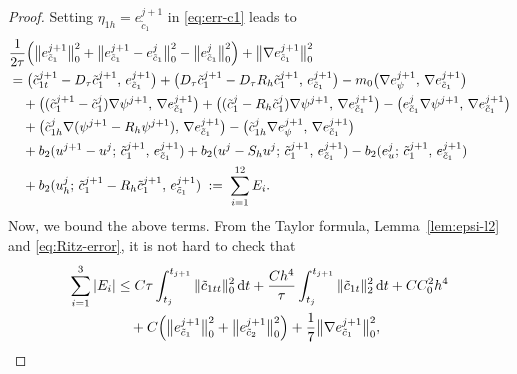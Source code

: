 \begin{proof}
Setting $\eta_{1h} = e_{\tilde{c}_{1}}^{j+1}$ in \eqref{eq:err-c1} leads to
\begin{align}
  &\frac{1}{2\tau}\Bigl(\bigl\|e_{\tilde{c}_{1}}^{j+1}\bigr\|_{0}^{2}
                       + \bigl\|e_{\tilde{c}_{1}}^{j+1} - e_{\tilde{c}_{1}}^{j}\bigr\|_{0}^{2}
                       - \bigl\|e_{\tilde{c}_{1}}^{j}\bigr\|_{0}^{2}\Bigr)
   + \bigl\|\nabla e_{\tilde{c}_{1}}^{j+1}\bigr\|_{0}^{2}
  \nonumber\\
  &= \bigl(\tilde{c}_{1t}^{j+1} - D_{\tau}\tilde{c}_{1}^{j+1},\, e_{\tilde{c}_{1}}^{j+1}\bigr)
   + \bigl(D_{\tau}\tilde{c}_{1}^{j+1} - D_{\tau}R_{h}\tilde{c}_{1}^{j+1},\, e_{\tilde{c}_{1}}^{j+1}\bigr)
   - m_{0}\bigl(\nabla e_{\psi}^{j+1},\, \nabla e_{\tilde{c}_{1}}^{j+1}\bigr)
  \nonumber\\
  &\quad + \bigl((\tilde{c}_{1}^{j+1}-\tilde{c}_{1}^{j})\nabla\psi^{j+1},\, \nabla e_{\tilde{c}_{1}}^{j+1}\bigr)
   + \bigl((\tilde{c}_{1}^{j} - R_{h}\tilde{c}_{1}^{j})\nabla\psi^{j+1},\, \nabla e_{\tilde{c}_{1}}^{j+1}\bigr)
   - \bigl(e_{\tilde{c}_{1}}^{j}\nabla\psi^{j+1},\, \nabla e_{\tilde{c}_{1}}^{j+1}\bigr)
  \nonumber\\
  &\quad + \bigl(\tilde{c}_{1h}^{j}\nabla(\psi^{j+1} - R_{h}\psi^{j+1}),\, \nabla e_{\tilde{c}_{1}}^{j+1}\bigr)
   - \bigl(\tilde{c}_{1h}^{j}\nabla e_{\psi}^{j+1},\, \nabla e_{\tilde{c}_{1}}^{j+1}\bigr)
  \nonumber\\
  &\quad + b_{2}(u^{j+1}-u^{j};\, \tilde{c}_{1}^{j+1},\, e_{\tilde{c}_{1}}^{j+1})
   + b_{2}(u^{j} - S_{h}u^{j};\, \tilde{c}_{1}^{j+1},\, e_{\tilde{c}_{1}}^{j+1})
   - b_{2}(e_{u}^{j};\, \tilde{c}_{1}^{j+1},\, e_{\tilde{c}_{1}}^{j+1})
  \nonumber\\
  &\quad + b_{2}(u_{h}^{j};\, \tilde{c}_{1}^{j+1} - R_{h}\tilde{c}_{1}^{j+1},\, e_{\tilde{c}_{1}}^{j+1})
   \;:=\; \sum_{i=1}^{12} E_{i}.
  \label{eq:E-sum}
\end{align}
Now, we bound the above terms. From the Taylor formula, Lemma~\ref{lem:epsi-l2} and \eqref{eq:Ritz-error}, it is not hard to check that
\begin{align}
  \sum_{i=1}^{3}|E_{i}|
  &\leq C\tau\int_{t_{j}}^{t_{j+1}}\|\tilde{c}_{1tt}\|_{0}^{2}\,\mathrm{d}t
   + \frac{Ch^{4}}{\tau}\int_{t_{j}}^{t_{j+1}}\|\tilde{c}_{1t}\|_{2}^{2}\,\mathrm{d}t
   + CC_{0}^{2}h^{4} \nonumber\\
  &\quad + C\Bigl(\bigl\|e_{\tilde{c}_{1}}^{j+1}\bigr\|_{0}^{2}
                 + \bigl\|e_{\tilde{c}_{2}}^{j+1}\bigr\|_{0}^{2}\Bigr)
   + \frac{1}{7}\bigl\|\nabla e_{\tilde{c}_{1}}^{j+1}\bigr\|_{0}^{2},

\end{align}
\end{proof}
